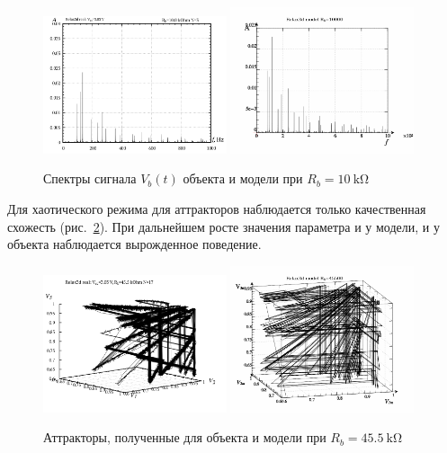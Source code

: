 \begin{figure}[htb!]
  \centerline{
    \hfill
    \includegraphics[width=0.48\textwidth]{p/relax3_f_03.png}
    \hfill
    \includegraphics[width=0.48\textwidth]{p/relax3d_read_q-p_fm_03a.png}
    \hfill
  }
  \caption{Спектры сигнала $V_b(t)$ объекта и модели при  $R_b=\SI{10}{\kilo\ohm}$}
  \label{atu:f:relax3d_mo_f_03}
\end{figure}

Для хаотического режима для аттракторов наблюдается только
качественная схожесть (рис.~\ref{atu:f:relax3d_mo_v1v2v3m_17}).
При дальнейшем росте значения параметра
и у модели, и у объекта наблюдается вырожденное поведение.


\begin{figure}[htb!]
  \centerline{
    \hfill
    \includegraphics[width=0.48\textwidth]{p/relax3_v1v2v3_17.png}
    \hfill
    \includegraphics[width=0.48\textwidth]{p/relax3d_read_q-p_v1v2v3m_17a.png}
    \hfill
  }
  \caption{Аттракторы, полученные для объекта и модели при  $R_b=\SI{45.5}{\kilo\ohm}$}
  \label{atu:f:relax3d_mo_v1v2v3m_17}
\end{figure}

